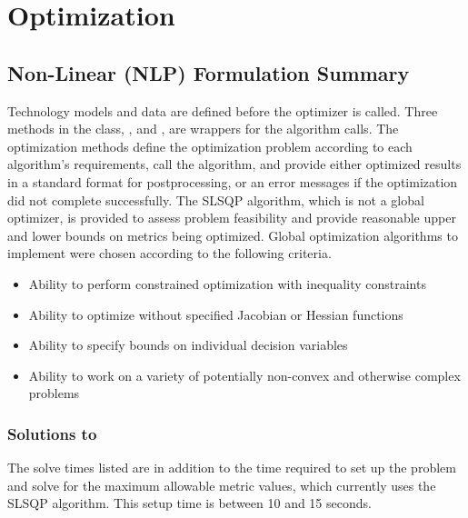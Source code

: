 \documentclass[letterpaper,10pt,english]{sphinxmanual}
\begin{document}
\begin{sphinxVerbatim}[commandchars=\\\{\}]
   \PYG{p}{[}  \PYG{p}{]}
\end{sphinxVerbatim}


\chapter{Optimization}
\label{\detokenize{doc-src/optimizers:optimization}}\label{\detokenize{doc-src/optimizers::doc}}

\section{Non-Linear (NLP) Formulation Summary}
\label{\detokenize{doc-src/optimizers:non-linear-nlp-formulation-summary}}
Technology models and data are defined before the optimizer is called.
Three methods in the  class,
,  and , are
wrappers for the algorithm calls. The optimization methods define the
optimization problem according to each algorithm’s requirements, call
the algorithm, and provide either optimized results in a standard format
for postprocessing, or an error messages if the optimization did not
complete successfully. The SLSQP algorithm, which is not a global
optimizer, is provided to assess problem feasibility and provide
reasonable upper and lower bounds on metrics being optimized. Global
optimization algorithms to implement were chosen according to the
following criteria.
\begin{itemize}
\item {} 
Ability to perform constrained optimization with inequality
constraints

\item {} 
Ability to optimize without specified Jacobian or Hessian functions

\item {} 
Ability to specify bounds on individual decision variables

\item {} 
Ability to work on a variety of potentially non-convex and otherwise
complex problems

\end{itemize}


\subsection{Solutions to }
\label{\detokenize{doc-src/optimizers:solutions-to-pv-residential-simple}}
The solve times listed are in addition to the time required to set up
the problem and solve for the maximum allowable metric values, which
currently uses the SLSQP algorithm. This setup time is between 10 and 15
seconds.
\end{document}
